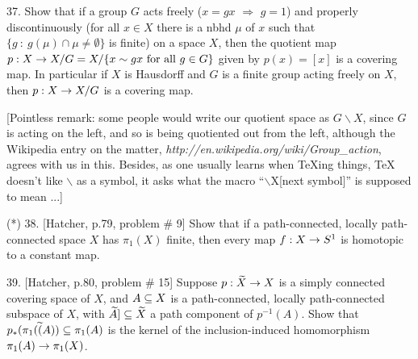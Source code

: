 \documentclass[12pt]{article}
\begin{document}
\begin{description}
\msk

\item{37.} Show that if a group $G$ acts freely ($x=gx$ $\Rightarrow$ $g=1$)
and properly discontinuously (for all $x\in X$ there is a nbhd $\mu$ of $x$ such that
$\{g\ :\ g(\mu)\cap\mu\neq\emptyset\}$ is finite)
on a space $X$, then the quotient map $p:X\rightarrow X/G=X/\{x\sim gx \textrm{\ for all\ } g\in G\}$
given by $p(x)=[x]$
is a covering map. In particular if $X$ is Hausdorff and $G$ is a finite group acting freely on $X$,
then $p:X\rightarrow X/G$ is a covering map. 

\msk

\item{\spc} [Pointless remark: some people would write our quotient 
space as $G\backslash X$, since $G$ is acting on the left, and so is being quotiented out from the left,
although the Wikipedia entry on the matter, 
{\it http://en.wikipedia.org/wiki/Group{\_}action},
agrees with us in this. Besides, as one usually learns when TeXing things, TeX doesn't like $\backslash$
as a symbol, it asks what the macro ``$\backslash$X[next symbol]'' is supposed to mean ...]

\msk

\item{(*)} 38. [Hatcher, p.79, problem \# 9] Show that if a path-connected, locally path-connected space
$X$ has $\pi_1(X)$ finite, then every map $f:X\rightarrow S^1$ is homotopic to a constant map.

\msk

\item{39.} [Hatcher, p.80, problem \# 15] Suppose $p:\widetilde{X}\rightarrow X$ is a simply connected covering space of $X$,
and $A\subseteq X$ is a path-connected, locally path-connected subspace of $X$, with $\widetilde{A}]\subseteq\widetilde{X}$ a 
path component of $p^{-1}(A)$. Show that $p_*(\pi_1(\widetilde(A))\subseteq \pi_1(A)$ is the kernel of the inclusion-induced 
homomorphism $\pi_1(A)\rightarrow\pi_1(X)$. 



\end{description}
\vfill
\end{document}
